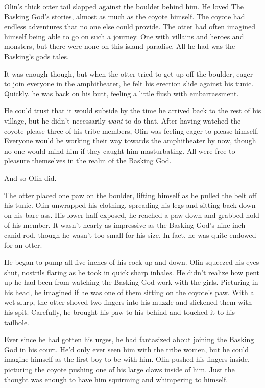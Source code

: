 Olin's thick otter tail slapped against the boulder behind him. He loved The Basking God's stories, almost as much as the coyote himself. The coyote had endless adventures that no one else could provide. The otter had often imagined himself being able to go on such a journey. One with villains and heroes and monsters, but there were none on this island paradise. All he had was the Basking's gods tales.

It was enough though, but when the otter tried to get up off the boulder, eager to join everyone in the amphitheater, he felt his erection slide against his tunic. Quickly, he was back on his butt, feeling a little flush with embarrassment.

He could trust that it would subside by the time he arrived back to the rest of his village, but he didn't necessarily \emph{want} to do that. After having watched the coyote please three of his tribe members, Olin was feeling eager to please himself. Everyone would be working their way towards the amphitheater by now, though no one would mind him if they caught him masturbating. All were free to pleasure themselves in the realm of the Basking God.

And so Olin did.

The otter placed one paw on the boulder, lifting himself as he pulled the belt off his tunic. Olin unwrapped his clothing, spreading his legs and sitting back down on his bare ass. His lower half exposed, he reached a paw down and grabbed hold of his member. It wasn't nearly as impressive as the Basking God's nine inch canid rod, though he wasn't too small for his size. In fact, he was quite endowed for an otter.

He began to pump all five inches of his cock up and down. Olin squeezed his eyes shut, nostrils flaring as he took in quick sharp inhales. He didn't realize how pent up he had been from watching the Basking God work with the girls. Picturing in his head, he imagined if he was one of them sitting on the coyote's paw. With a wet slurp, the otter shoved two fingers into his muzzle and slickened them with his spit. Carefully, he brought his paw to his behind and touched it to his tailhole.

Ever since he had gotten his urges, he had fantasized about joining the Basking God in his court. He'd only ever seen him with the tribe women, but he could imagine himself as the first boy to be with him. Olin pushed his fingers inside, picturing the coyote pushing one of his large claws inside of him. Just the thought was enough to have him squirming and whimpering to himself.

